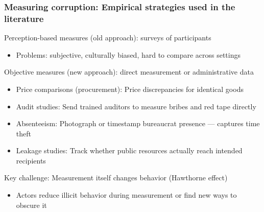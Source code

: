 \documentclass[aspectratio=169]{beamer}
\begin{document}
\begin{frame}
\frametitle{Measuring corruption: Empirical strategies used in the literature}

Perception-based measures (old approach): surveys of participants
\begin{itemize}\setlength\itemsep{3pt}
\item Problems: subjective, culturally biased, hard to compare across settings
\end{itemize}\medskip
Objective measures (new approach): direct measurement or administrative data
\begin{itemize}\setlength\itemsep{3pt}
\item Price comparisons (procurement): Price discrepancies for identical goods
\item Audit studies: Send trained auditors to measure bribes and red tape directly
\item Absenteeism: Photograph or timestamp bureaucrat presence — captures time theft
\item Leakage studies: Track whether public resources actually reach intended recipients
\end{itemize}\medskip
Key challenge: Measurement itself changes behavior (Hawthorne effect)
\begin{itemize}\setlength\itemsep{3pt}
\item Actors reduce illicit behavior during measurement or find new ways to obscure it
\end{itemize}
\end{frame}
\end{document}
